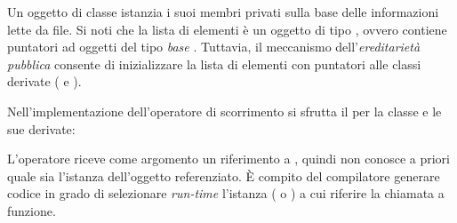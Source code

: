 

\lstset{basicstyle=\sf}

Un oggetto di classe  istanzia i suoi membri privati sulla base delle
informazioni lette da file. Si noti che la lista di elementi \`e un
oggetto di tipo , ovvero contiene puntatori
ad oggetti del tipo \emph{base} . Tuttavia, il
meccanismo dell'\emph{ereditariet\`a pubblica} consente di
inizializzare la lista di elementi con puntatori alle classi derivate
( e ).

Nell'implementazione dell'operatore di scorrimento si sfrutta il
 per la classe  e le sue derivate:

\lstset{basicstyle=\scriptsize\sf}

\lstset{basicstyle=\sf}

L'operatore riceve come argomento un riferimento a , quindi
non conosce a priori quale sia l'istanza dell'oggetto referenziato. \`E compito del compilatore
generare codice in grado di selezionare \emph{run-time} l'istanza
( o ) a cui riferire la chiamata a
funzione.

\lstset{basicstyle=\scriptsize\sf}


\lstset{basicstyle=\sf}

